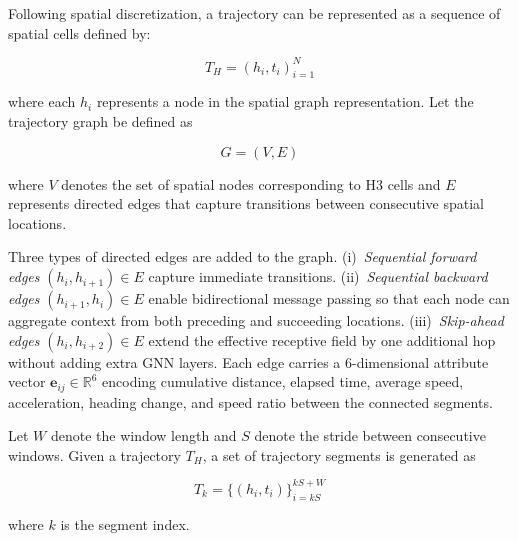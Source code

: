 \documentclass[conference]{IEEEtran}
\begin{document}
Following spatial discretization, a trajectory can be represented as a sequence of spatial cells defined by:

\begin{equation}
T_H = {(h_i, t_i)}_{i=1}^{N}
\end{equation}

where each $h_i$ represents a node in the spatial graph representation.
Let the trajectory graph be defined as

\begin{equation}
G = (V, E)
\end{equation}

where $V$ denotes the set of spatial nodes corresponding to H3 cells and $E$ represents directed edges that capture transitions between consecutive spatial locations.

Three types of directed edges are added to the graph. (i)~\textit{Sequential forward edges} $(h_i, h_{i+1}) \in E$ capture immediate transitions. (ii)~\textit{Sequential backward edges} $(h_{i+1}, h_i) \in E$ enable bidirectional message passing so that each node can aggregate context from both preceding and succeeding locations. (iii)~\textit{Skip-ahead edges} $(h_i, h_{i+2}) \in E$ extend the effective receptive field by one additional hop without adding extra GNN layers. Each edge carries a 6-dimensional attribute vector $\mathbf{e}_{ij} \in \mathbb{R}^6$ encoding cumulative distance, elapsed time, average speed, acceleration, heading change, and speed ratio between the connected segments.

Let $W$ denote the window length and $S$ denote the stride between consecutive windows. Given a trajectory $T_H$, a set of trajectory segments is generated as

\begin{equation}
T_k = \{(h_i, t_i)\}_{i=kS}^{kS+W}
\end{equation}

where $k$ is the segment index.
\end{document}
